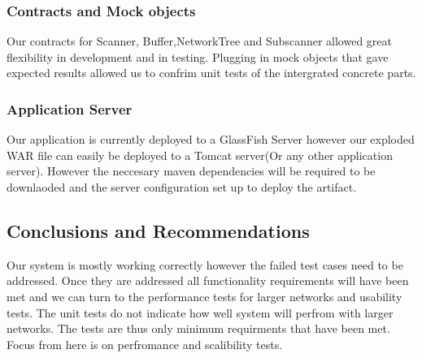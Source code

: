 \documentclass[hidelinks,a4paper,12pt]{article}
\begin{document}
\subsubsection{Contracts and Mock objects}
Our contracts for  Scanner, Buffer,NetworkTree and Subscanner allowed great flexibility  in development and in testing. Plugging in mock objects that gave expected results allowed us to confrim unit tests of the intergrated concrete parts.
\subsubsection{Application Server}
Our application is currently deployed to a GlassFish Server however our exploded WAR file can easily be deployed to a Tomcat server(Or any other application server). However the neccesary maven dependencies will be required to be downlaoded and the server configuration set up to deploy the artifact.

\subsection{Conclusions and Recommendations}
Our system is mostly working correctly however the failed test cases need to be addressed. Once they are addressed all functionality requirements will have been met and we can turn to the performance tests for larger networks and usability tests. The unit tests do not indicate how well system will perfrom with larger networks. The tests are thus only minimum requirments that have been met.  Focus from here is on perfromance and scalibility tests.
\end{document}
